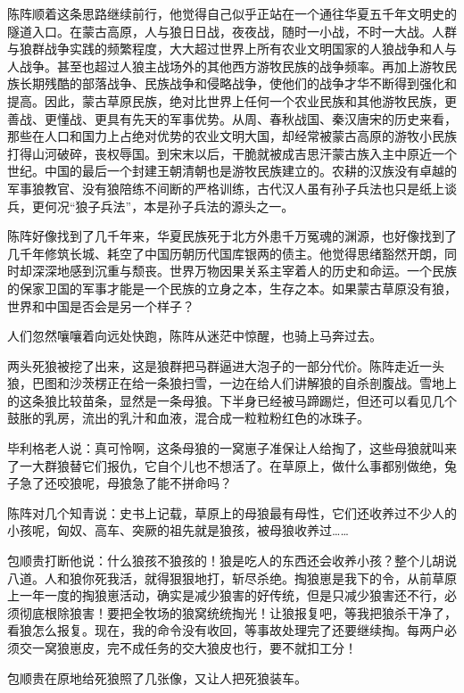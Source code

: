 \par 陈阵顺着这条思路继续前行，他觉得自己似乎正站在一个通往华夏五千年文明史的隧道入口。在蒙古高原，人与狼日日战，夜夜战，随时一小战，不时一大战。人群与狼群战争实践的频繁程度，大大超过世界上所有农业文明国家的人狼战争和人与人战争。甚至也超过人狼主战场外的其他西方游牧民族的战争频率。再加上游牧民族长期残酷的部落战争、民族战争和侵略战争，使他们的战争才华不断得到强化和提高。因此，蒙古草原民族，绝对比世界上任何一个农业民族和其他游牧民族，更善战、更懂战、更具有先天的军事优势。从周、春秋战国、秦汉唐宋的历史来看，那些在人口和国力上占绝对优势的农业文明大国，却经常被蒙古高原的游牧小民族打得山河破碎，丧权辱国。到宋末以后，干脆就被成吉思汗蒙古族入主中原近一个世纪。中国的最后一个封建王朝清朝也是游牧民族建立的。农耕的汉族没有卓越的军事狼教官、没有狼陪练不间断的严格训练，古代汉人虽有孙子兵法也只是纸上谈兵，更何况“狼子兵法”，本是孙子兵法的源头之一。
\par 陈阵好像找到了几千年来，华夏民族死于北方外患千万冤魂的渊源，也好像找到了几千年修筑长城、耗空了中国历朝历代国库银两的债主。他觉得思绪豁然开朗，同时却深深地感到沉重与颓丧。世界万物因果关系主宰着人的历史和命运。一个民族的保家卫国的军事才能是一个民族的立身之本，生存之本。如果蒙古草原没有狼，世界和中国是否会是另一个样子？
\par 
\par 人们忽然嚷嚷着向远处快跑，陈阵从迷茫中惊醒，也骑上马奔过去。
\par 两头死狼被挖了出来，这是狼群把马群逼进大泡子的一部分代价。陈阵走近一头狼，巴图和沙茨楞正在给一条狼扫雪，一边在给人们讲解狼的自杀剖腹战。雪地上的这条狼比较苗条，显然是一条母狼。下半身已经被马蹄踢烂，但还可以看见几个鼓胀的乳房，流出的乳汁和血液，混合成一粒粒粉红色的冰珠子。
\par 毕利格老人说：真可怜啊，这条母狼的一窝崽子准保让人给掏了，这些母狼就叫来了一大群狼替它们报仇，它自个儿也不想活了。在草原上，做什么事都别做绝，兔子急了还咬狼呢，母狼急了能不拼命吗？
\par 陈阵对几个知青说：史书上记载，草原上的母狼最有母性，它们还收养过不少人的小孩呢，匈奴、高车、突厥的祖先就是狼孩，被母狼收养过……
\par 包顺贵打断他说：什么狼孩不狼孩的！狼是吃人的东西还会收养小孩？整个儿胡说八道。人和狼你死我活，就得狠狠地打，斩尽杀绝。掏狼崽是我下的令，从前草原上一年一度的掏狼崽活动，确实是减少狼害的好传统，但是只减少狼害还不行，必须彻底根除狼害！要把全牧场的狼窝统统掏光！让狼报复吧，等我把狼杀干净了，看狼怎么报复。现在，我的命令没有收回，等事故处理完了还要继续掏。每两户必须交一窝狼崽皮，完不成任务的交大狼皮也行，要不就扣工分！
\par 包顺贵在原地给死狼照了几张像，又让人把死狼装车。
